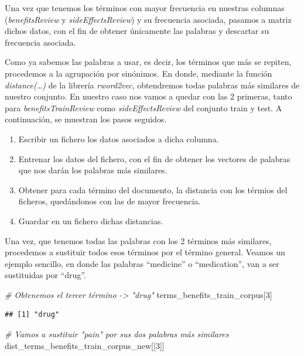 \documentclass[spanish,]{article}
\newenvironment{Shaded}{\begin{snugshade}}{\end{snugshade}}
\newcommand{\DecValTok}[1]{\textcolor[rgb]{0.00,0.00,0.81}{#1}}
\newcommand{\CommentTok}[1]{\textcolor[rgb]{0.56,0.35,0.01}{\textit{#1}}}
\newcommand{\NormalTok}[1]{#1}
\providecommand{\tightlist}{%
  \setlength{\itemsep}{0pt}\setlength{\parskip}{0pt}}
\begin{document}
Una vez que tenemos los términos con mayor frecuencia en nuestras
columnas (\emph{benefitsReview} y \emph{sideEffectsReview}) y su
frecuencia asociada, pasamos a matriz dichos datos, con el fin de
obtener únicamente las palabras y descartar su frecuencia asociada.

Como ya sabemos las palabras a usar, es decir, los términos que más se
repiten, procedemos a la agrupación por sinónimos. En donde, mediante la
función \emph{distance(\ldots{})} de la librería \emph{rword2vec},
obtendremos todas palabras más similares de nuestro conjunto. En nuestro
caso nos vamos a quedar con las 2 primeras, tanto para
\emph{benefitsTrainReview} como \emph{sideEffectsReview} del conjunto
train y test. A continuación, se muestran los pasos seguidos.

\begin{enumerate}
\def\labelenumi{\arabic{enumi}.}
\tightlist
\item
  Escribir un fichero los datos asociados a dicha columna.
\item
  Entrenar los datos del fichero, con el fin de obtener los vectores de
  palabras que nos darán los palabras más similares.
\item
  Obtener para cada término del documento, la distancia con los térmios
  del ficheros, quedándonos con las de mayor frecuencia.
\item
  Guardar en un fichero dichas distancias.
\end{enumerate}

Una vez, que tenemos todas las palabras con los 2 términos más
similares, procedemos a sustituir todos esos términos por el término
general. Veamos un ejemplo sencillo, en donde las palabras ``medicine''
o ``medication'', van a ser sustituidas por ``drug''.

\begin{Shaded}
\begin{Highlighting}[]
\CommentTok{# Obtenemos el tercer término -> "drug"}
\NormalTok{terms_benefits_train_corpus[}\DecValTok{3}\NormalTok{]}
\end{Highlighting}
\end{Shaded}

\begin{verbatim}
## [1] "drug"
\end{verbatim}

\begin{Shaded}
\begin{Highlighting}[]
\CommentTok{# Vamos a sustituir "pain" por sus dos palabras más similares}
\NormalTok{dist_terms_benefits_train_corpus_new[[}\DecValTok{3}\NormalTok{]]}
\end{Highlighting}
\end{Shaded}
\end{document}

